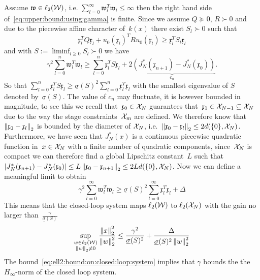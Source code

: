 %
Assume $\mathfrak{w}\in\ell_2(\mathcal W)$, i.e. $\sum_{l=0}^\infty\mathfrak{w}_l^T\mathfrak{w}_l\leq\infty$ then the right hand side of~\eqref{eq:upper:bound:using:gamma} is finite. 
%
Since we assume $Q\succeq0$, $R\succ0$ and due to the piecewise affine character of~$k(x)$ there exist $S_l\succ0$ such that
%
\[
	\mathfrak{x}_l^TQ\mathfrak{x}_l+u_0(\mathfrak{x}_l)^TRu_0(\mathfrak{x}_l)\geq \mathfrak{x}_l^T S_l\mathfrak{x}_l
\]
%
and with $S:=\liminf_{l\geq0}S_l\succ0$ we have
%
\[
	\gamma^2 \sum_{l=0}^n \mathfrak{w}_l^T\mathfrak{w}_l \geq \sum_{l=0}^n \mathfrak{x}_l^TS\mathfrak{x}_l +\underbrace{2\left(J_N^\ast(\mathfrak{x}_{n+1})-J_N^\ast(\mathfrak{x}_0)\right)}_{c_n}.
\]
%
So that $\sum_{l=0}^n \mathfrak{x}_l^TS\mathfrak{x}_l\geq \underline{\sigma}(S)^2\sum_{l=0}^n \mathfrak{x}_l^T\mathfrak{x}_l$ with the smallest eigenvalue of $S$ denoted by~$\underline{\sigma}(S)$.
%
The value of $c_n$ may fluctuate, it is however bounded in magnitude, to see this we recall that~$\mathfrak{x}_0\in\mathcal X_N$ guarantees that~$\mathfrak{x}_1\in\mathcal X_{N-1}\subseteq\mathcal X_N$ due to the way the stage constraints~$\mathcal X_m$ are defined. 
%
We therefore know that $\left\|\mathfrak{x}_0-\mathfrak{x}_l\right\|_2$ is bounded by the diameter of $\mathcal X_N$, i.e.~$\left\|\mathfrak{x}_0-\mathfrak{x}_l\right\|_2\leq 2 d(\{0\},\mathcal X_N)$.
%
Furthermore, we have seen that $J_N^\ast(x)$ is a continuous piecewise quadratic function in~$x\in\mathcal X_N$ with a finite number of quadratic components, since~$\mathcal X_N$ is compact we can therefore find a global Lipschitz constant~$L$ such that $\left|J_N^\ast(\mathfrak{x}_{n+1})-J_N^\ast(\mathfrak{x}_0)\right|\leq L\left\|\mathfrak{x}_0-\mathfrak{x}_{n+1}\right\|_2\leq2L d(\{0\},\mathcal X_N)$.
%
Now we can define a meaningful limit to obtain
%
\begin{equation}
	\gamma^2 \sum_{l=0}^\infty \mathfrak{w}_l^T\mathfrak{w}_l \geq \underline{\sigma}(S)^2\sum_{l=0}^\infty \mathfrak{x}_l^T\mathfrak{x}_l + \Delta
\end{equation}
%
This means that the closed-loop system maps $\ell_2(\mathcal W)$ to $\ell_2(\mathcal X_N)$ with the gain no larger than~$\frac{\gamma}{\underline{\sigma}(S)}$
%
\begin{equation}\label{eq:ell2:bound:on:closed:loop:system}
	\sup_{\substack{w\in\ell_2(\mathcal W)\\ \left\|w\right\|_2\neq0}} \frac{\left\|x\right\|_2^2}{\left\|w\right\|_2^2}\leq\frac{\gamma^2}{\underline{\sigma}(S)^2} + \frac{\Delta}{\underline{\sigma}(S)^2\left\|w\right\|_2^2}
\end{equation}
%
The bound~\eqref{eq:ell2:bound:on:closed:loop:system} implies that $\gamma$ bounds the the $H_\infty$-norm of the closed loop system.
